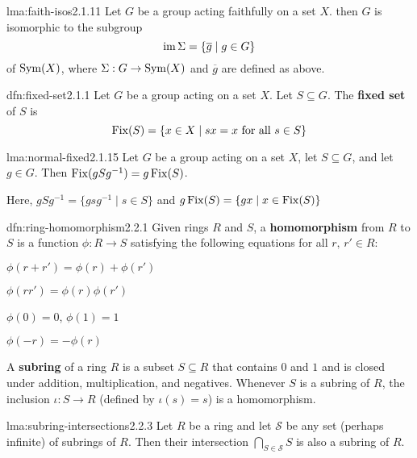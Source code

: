 \documentclass[landscape, 8pt]{extarticle}
\begin{document}
\begin{multicols}{3}

\begin{lma}{lma:faith-isos}{2.1.11}
    Let $G$ be a group acting faithfully on a set $X$. then $G$ is isomorphic to the subgroup
    \[\operatorname{im} \Sigma = \{\overline{g} \mid g\in G\}\]
    of $\operatorname{Sym}(X)$, where $\Sigma : G \to \operatorname{Sym}(X)$ and $\overline{g}$ are defined as above.
\end{lma}

\begin{dfn}{dfn:fixed-set}{2.1.1}
    Let $G$ be a group acting on a set $X$. Let $S \subseteq G$. The \textbf{fixed set} of $S$ is
    \[\operatorname{Fix}(S) = \{ x\in X \mid sx = x \text{ for all } s\in S\}\]
\end{dfn}

\begin{lma}{lma:normal-fixed}{2.1.15}
    Let $G$ be a group acting on a set $X$, let $S \subseteq G$, and let $g\in G$. Then $\operatorname{Fix}(gSg^{-1}) = g\operatorname{Fix}(S)$.

    Here, $gSg^{-1} = \{gs g^{-1} \mid s\in S\}$ and $g\operatorname{Fix}(S) = \{gx \mid x \in \operatorname{Fix}(S)\}$
\end{lma}

\begin{dfn}{dfn:ring-homomorphism}{2.2.1}
    Given rings $R$ and $S$, a \textbf{homomorphism} from $R$ to $S$ is a function $\phi : R \to S$ satisfying the following equations for all $r,\,r'\in R$:
    \begin{multicols}{2}
    \begin{itemize-tight}
        \item $\phi(r+r') = \phi(r) + \phi(r')$
        \item $\phi(rr') = \phi(r)\phi(r')$
        \item $\phi(0) = 0$, $\phi(1) = 1$
        \item $\phi(-r) = -\phi(r)$
    \end{itemize-tight}
    \end{multicols}

    \longrule{0.08ex}
    A \textbf{subring} of a ring $R$ is a subset $S \subseteq R$ that contains $0$ and $1$ and is closed under addition, multiplication, and negatives. Whenever $S$ is a subring of $R$, the inclusion $\iota : S \to R$ (defined by $\iota(s) = s$) is a homomorphism.
\end{dfn}

\begin{lma}{lma:subring-intersections}{2.2.3}
    Let $R$ be a ring and let $\mathcal{S}$ be any set (perhaps infinite) of subrings of $R$. Then their intersection $\bigcap_{S\in \mathcal{S}} S$ is also a subring of $R$.
\end{lma}


\end{multicols}
\end{document}
